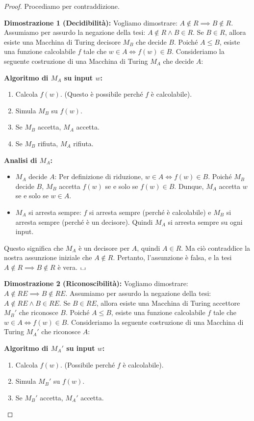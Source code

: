 \documentclass[a4paper]{article}
\newcommand{\blankS}{\ensuremath{\raisebox{-0.15ex}{\scalebox{1.3}[0.7]{$\sqcup$}}}}
\theoremstyle{definition} %
\begin{document}
\begin{proof}
Procediamo per contraddizione.

\textbf{Dimostrazione 1 (Decidibilità):}
Vogliamo dimostrare: $A \notin R \implies B \notin R$.
Assumiamo per assurdo la negazione della tesi: $A \notin R \land B \in R$.
Se $B \in R$, allora esiste una Macchina di Turing decisore $M_B$ che decide $B$.
Poiché $A \le B$, esiste una funzione calcolabile $f$ tale che $w \in A \iff f(w) \in B$.
Consideriamo la seguente costruzione di una Macchina di Turing $M_A$ che decide $A$:

\textbf{Algoritmo di $M_A$ su input $w$:}
\begin{enumerate}
    \item Calcola $f(w)$. (Questo è possibile perché $f$ è calcolabile).
    \item Simula $M_B$ su $f(w)$.
    \item Se $M_B$ accetta, $M_A$ accetta.
    \item Se $M_B$ rifiuta, $M_A$ rifiuta.
\end{enumerate}

\textbf{Analisi di $M_A$:}
\begin{itemize}
    \item $M_A$ decide $A$: Per definizione di riduzione, $w \in A \iff f(w) \in B$. Poiché $M_B$ decide $B$, $M_B$ accetta $f(w)$ se e solo se $f(w) \in B$. Dunque, $M_A$ accetta $w$ se e solo se $w \in A$.
    \item $M_A$ si arresta sempre: $f$ si arresta sempre (perché è calcolabile) e $M_B$ si arresta sempre (perché è un decisore). Quindi $M_A$ si arresta sempre su ogni input.
\end{itemize}
Questo significa che $M_A$ è un decisore per $A$, quindi $A \in R$.
Ma ciò contraddice la nostra assunzione iniziale che $A \notin R$.
Pertanto, l'assunzione è falsa, e la tesi $A \notin R \implies B \notin R$ è vera.
$\blankS$

\textbf{Dimostrazione 2 (Riconoscibilità):}
Vogliamo dimostrare: $A \notin RE \implies B \notin RE$.
Assumiamo per assurdo la negazione della tesi: $A \notin RE \land B \in RE$.
Se $B \in RE$, allora esiste una Macchina di Turing accettore $M_B'$ che riconosce $B$.
Poiché $A \le B$, esiste una funzione calcolabile $f$ tale che $w \in A \iff f(w) \in B$.
Consideriamo la seguente costruzione di una Macchina di Turing $M_A'$ che riconosce $A$:

\textbf{Algoritmo di $M_A'$ su input $w$:}
\begin{enumerate}
    \item Calcola $f(w)$. (Possibile perché $f$ è calcolabile).
    \item Simula $M_B'$ su $f(w)$.
    \item Se $M_B'$ accetta, $M_A'$ accetta.
\end{enumerate}


\end{proof}
\end{document}
